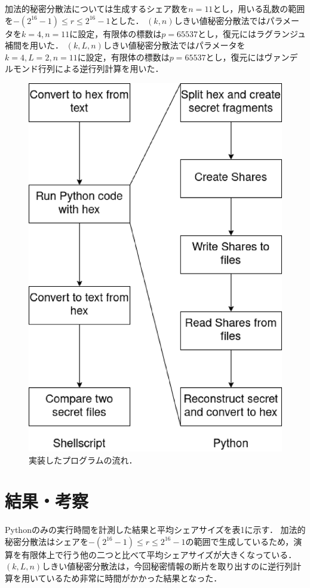 \documentclass[twocolumn]{jarticle}
\begin{document}
加法的秘密分散法については生成するシェア数を$n=11$とし，用いる乱数の範囲を$-(2^{16}-1){\leq}r{\leq}2^{16}-1$とした．
%
$(k,n)$しきい値秘密分散法ではパラメータを$k=4,n=11$に設定，有限体の標数は$p=65537$とし，復元にはラグランジュ補間を用いた．
%
$(k,L,n)$しきい値秘密分散法ではパラメータを$k=4,L=2,n=11$に設定，有限体の標数は$p=65537$とし，復元にはヴァンデルモンド行列による逆行列計算を用いた．
%
\begin{figure}[t]
	\begin{center}
		\includegraphics[scale=0.3]{program.eps}
		\caption{実装したプログラムの流れ．}
		\label{fig:program}
	\end{center}
\end{figure}


\section{結果・考察}
Pythonのみの実行時間を計測した結果と平均シェアサイズを表1に示す．
%
加法的秘密分散法はシェアを$-(2^{16}-1){\leq}r{\leq}2^{16}-1$の範囲で生成しているため，演算を有限体上で行う他の二つと比べて平均シェアサイズが大きくなっている．
%
$(k,L,n)$しきい値秘密分散法は，今回秘密情報の断片を取り出すのに逆行列計算を用いているため非常に時間がかかった結果となった．
\end{document}

